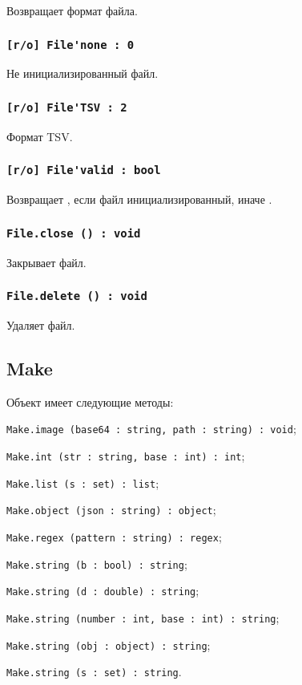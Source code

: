 Возвращает формат файла.

\subsubsection{\lstinline|[r/o] File'none : 0|}

Не инициализированный файл.

\subsubsection{\lstinline|[r/o] File'TSV : 2|}

Формат TSV.

\subsubsection{\lstinline|[r/o] File'valid : bool|}

Возвращает \true, если файл инициализированный, иначе \false.

\subsubsection{\lstinline|File.close () : void|}

Закрывает файл.

\subsubsection{\lstinline|File.delete () : void|}

Удаляет файл.

\subsection{{\color{orange} Make}}

Объект \make{} имеет следующие методы:
\begin{icItems}
	\item \lstinline|Make.image (base64 : string, path : string) : void|;
	\item \lstinline|Make.int (str : string, base : int) : int|;
	\item \lstinline|Make.list (s : set) : list|;
	\item \lstinline|Make.object (json : string) : object|;
	\item \lstinline|Make.regex (pattern : string) : regex|;
	\item \lstinline|Make.string (b : bool) : string|;
	\item \lstinline|Make.string (d : double) : string|;
	\item \lstinline|Make.string (number : int, base : int) : string|;
	\item \lstinline|Make.string (obj : object) : string|;
	\item \lstinline|Make.string (s : set) : string|.
\end{icItems}

